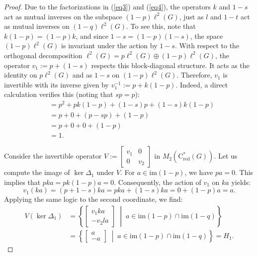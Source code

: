 \documentclass[10pt,a4paper]{amsart}
\newcommand{\Csr}{\mathrm{C}^*_{\text{red}}}
\begin{document}
\begin{proof}
Due to the factorizations in (\ref{eq3}) and (\ref{eq4}), the operators $k$ and $1-s$ act as mutual inverses on the subspace $(1-p) \ell^2(G)$, just as $l$ and $1-t$ act as mutual inverses on $(1-q) \ell^2(G)$. To see this, note that $k(1-p)=(1-p)k$, and since $1-s=(1-p)(1-s)$, the space $(1-p)\ell^2(G)$ is invariant under the action by $1-s$. With respect to the orthogonal decomposition $\ell^2(G)=p \ell^2(G) \oplus(1-p) \ell^2(G)$, the operator $v_1:=p+(1-s)$ respects this block-diagonal structure. It acts as the identity on $p \ell^2(G)$ and as $1-s$ on $(1-p) \ell^2(G)$. Therefore, $v_1$ is invertible with its inverse given by $v_1^{-1}:= p + k(1-p)$. 
Indeed, a direct calculation verifies this (noting that $sp = p$):
\begin{align*}
[p+(1-s)][p+k(1-p)] &= p^2 + pk(1-p) + (1-s)p + (1-s)k(1-p) \\
&= p + 0 + (p-sp) + (1-p) \\
&= p + 0 + 0 + (1-p) \\
&= 1.
\end{align*}


Consider the invertible operator $V:=\begin{bmatrix} v_1 & 0 \\ 0 & v_2 \end{bmatrix}$ in $M_2(\Csr(G))$. Let us compute the image of $\ker \Delta_1$ under $V$. For $a \in \mathrm{im}(1-p)$, we have $pa = 0$. This implies that $pka = pk(1-p)a = 0$. Consequently, the action of $v_1$ on $ka$ yields:
\[
v_1(ka) = (p+1-s)ka = pka + (1-s)ka = 0 + (1-p)a = a.
\]
Applying the same logic to the second coordinate, we find:
\begin{align*}
V(\ker \Delta_1) &= \left\{ \begin{bmatrix} v_1 ka \\ -v_2 la \end{bmatrix} \;\middle|\; a \in \mathrm{im}(1-p) \cap \mathrm{im}(1-q) \right\} \\
&= \left\{ \begin{bmatrix} a \\ -a \end{bmatrix} \;\middle|\; a \in \mathrm{im}(1-p) \cap \mathrm{im}(1-q) \right\} = H_1.
\end{align*}


\end{proof}
\end{document}
